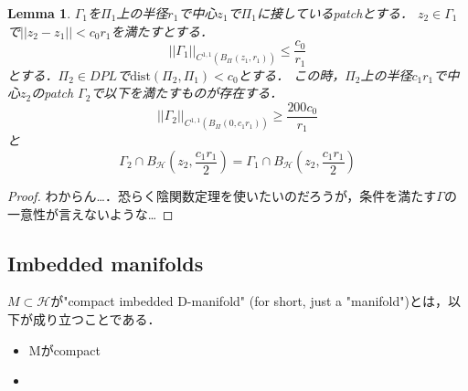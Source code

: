 \documentclass{ujarticle}
\newtheorem{lem}[thm]{Lemma}
\newcommand{\bh}[2]{B_{\mathcal{H}}(#1,#2)}
\newcommand{\bp}[3]{B_{\Pi_{#3}}(#1,#2)}
\newcommand{\gn}[4]{||\Gamma_{#1}||_{C^{1,1}(\bp{#2}{#3}{#4})}}
\newcommand{\gnaaad}{||\Gamma_1||_{C^{1,1}(\bp{z_1}{r_1}{})}}
\begin{document}
\begin{lem}
  $\Gamma_1$を$\Pi_1$上の半径$r_1$で中心$z_1$で$\Pi_1$に接しているpatchとする．
  $z_2 \in \Gamma_1$で$||z_2 -z_1 || < c_0r_1$を満たすとする．
  \begin{equation*}
   \gnaaad \le \frac{c_0}{r_1}
  \end{equation*}
  とする．$\Pi_2 \in DPL$で$\mathrm{dist}(\Pi_2,\Pi_1) <c_0$とする．
  この時，$\Pi_2$上の半径$c_1r_1$で中心$z_2$のpatch $\Gamma_2$で以下を満たすものが存在する．
  \begin{equation*}
   \gn{2}{0}{c_1r_1}{} \ge \frac{200c_0}{r_1}
  \end{equation*}
と
\begin{equation*}
\Gamma_2 \cap \bh{z_2}{\frac{c_1r_1}{2}} = \Gamma_1 \cap \bh{z_2}{\frac{c_1r_1}{2}}
\end{equation*}
\end{lem}

\begin{proof}
 わからん…．恐らく陰関数定理を使いたいのだろうが，条件を満たす$\Gamma$の一意性が言えないような…
\end{proof}

\subsection{Imbedded manifolds}
\label{sub:Imbedded manifolds}
$M \subset \mathcal{H}$が"compact imbedded D-manifold" (for short, just a "manifold")とは，以下が成り立つことである．
\begin{itemize}
  \item Mがcompact
  \item
\end{itemize}
\end{document}
